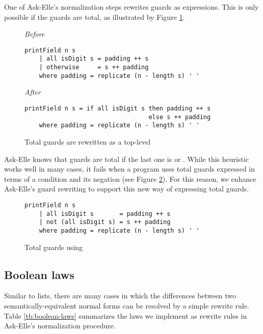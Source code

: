 One of Ask-Elle's normalization steps rewrites guards as  expressions. This is only possible if the guards are total, as illustrated by Figure \ref{fig:ex3-total-guards}.

\begin{figure}
\centering
\emph{Before}
\begin{verbatim}
printField n s
    | all isDigit s = padding ++ s
    | otherwise     = s ++ padding
    where padding = replicate (n - length s) ' '
\end{verbatim}
\smallskip
\emph{After}
\begin{verbatim}
printField n s = if all isDigit s then padding ++ s
                                  else s ++ padding
    where padding = replicate (n - length s) ' '
\end{verbatim}
\caption{Total guards are rewritten as a top-level }
\label{fig:ex3-total-guards}
\end{figure}

Ask-Elle knows that guards are total if the last one is  or . While this heuristic works well in many cases, it fails when a program uses total guards expressed in terms of a condition and its negation (see Figure \ref{fig:ex3-total-guards-not}). For this reason, we enhance Ask-Elle's guard rewriting to support this new way of expressing total guards.

\begin{figure}
\begin{verbatim}
printField n s
    | all isDigit s       = padding ++ s
    | not (all isDigit s) = s ++ padding
    where padding = replicate (n - length s) ' '
\end{verbatim}
\caption{Total guards using }
\label{fig:ex3-total-guards-not}
\end{figure}

\subsection{Boolean laws}

Similar to lists, there are many cases in which the differences between two semantically-equivalent normal forms can be resolved by a simple rewrite rule. Table \ref{tb:boolean-laws} summarizes the laws we implement as rewrite rules in Ask-Elle's normalization procedure.

